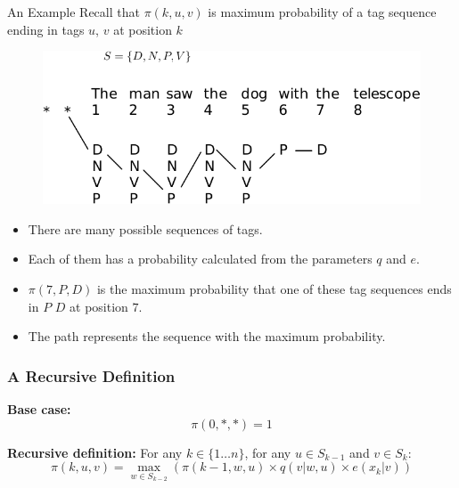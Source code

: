 \documentclass[handout]{beamer}
\begin{document}
\begin{frame}{An Example}
\scriptsize
Recall that   $\pi(k, u, v)$ is maximum probability of a tag sequence ending in tags $u$, $v$ at position $k$

  \begin{figure}[h]
        	\includegraphics[scale = 0.6]{pics/viterbi1.pdf}
        \end{figure}

\begin{itemize}
 \item There are many possible sequences of tags.
 \item Each of them has a probability calculated from the parameters $q$ and $e$.
 \item $\pi(7, P, D)$ is the maximum probability that one of these tag sequences ends in $P$ $D$ at position $7$.
 \item The path represents the sequence with the maximum probability.
\end{itemize}



\end{frame}



\begin{frame}
  \frametitle{A Recursive Definition}
  \textbf{Base case:}
  \[
    \pi(0, *, *) = 1
  \]

  \textbf{Recursive definition:}
  For any $k \in \{1 \ldots n\}$, for any $u \in S_{k-1}$ and $v \in S_k$:
  \[
    \pi(k, u, v) = \max_{w \in S_{k-2}} (\pi(k - 1, w, u) \times q(v|w, u) \times e(x_k|v))
  \]
\end{frame}
\end{document}
